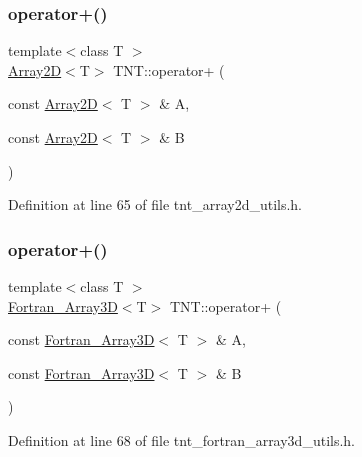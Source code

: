 \subsubsection{\texorpdfstring{operator+()}{operator+()}\hspace{0.1cm}{\footnotesize\ttfamily [4/7]}}
{\footnotesize\ttfamily template$<$class T $>$ \\
\hyperlink{classTNT_1_1Array2D}{Array2D}$<$T$>$ T\+N\+T\+::operator+ (\begin{DoxyParamCaption}\item[{const \hyperlink{classTNT_1_1Array2D}{Array2D}$<$ T $>$ \&}]{A,  }\item[{const \hyperlink{classTNT_1_1Array2D}{Array2D}$<$ T $>$ \&}]{B }\end{DoxyParamCaption})}



Definition at line 65 of file tnt\+\_\+array2d\+\_\+utils.\+h.

\mbox{\label{namespaceTNT_a7eb3cb2c72a4a811c26855a69d92ecfd}} 
\subsubsection{\texorpdfstring{operator+()}{operator+()}\hspace{0.1cm}{\footnotesize\ttfamily [5/7]}}
{\footnotesize\ttfamily template$<$class T $>$ \\
\hyperlink{classTNT_1_1Fortran__Array3D}{Fortran\+\_\+\+Array3D}$<$T$>$ T\+N\+T\+::operator+ (\begin{DoxyParamCaption}\item[{const \hyperlink{classTNT_1_1Fortran__Array3D}{Fortran\+\_\+\+Array3D}$<$ T $>$ \&}]{A,  }\item[{const \hyperlink{classTNT_1_1Fortran__Array3D}{Fortran\+\_\+\+Array3D}$<$ T $>$ \&}]{B }\end{DoxyParamCaption})}



Definition at line 68 of file tnt\+\_\+fortran\+\_\+array3d\+\_\+utils.\+h.

\mbox{\label{namespaceTNT_ab92825996c7ec6991d06eca11863e0c0}} 

